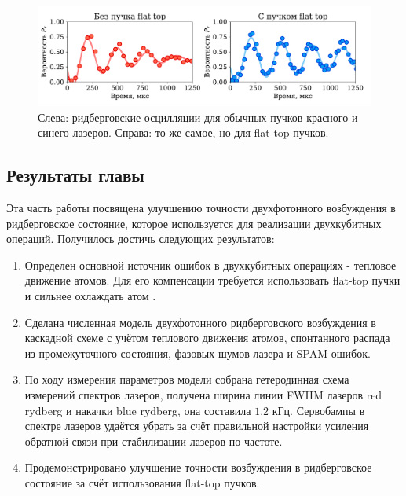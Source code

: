 \begin{figure}[H]
	\centering
	\includegraphics[width=1.0\textwidth]{images/rydberg_flattop_comp.pdf}
	\caption{Слева: ридберговские осцилляции для обычных пучков красного и синего лазеров. Справа: то же самое, но для flat-top пучков.}
	\label{fig:rydberg_flattop_comparison}
\end{figure}

\subsection{Результаты главы}

Эта часть работы посвящена улучшению точности двухфотонного возбуждения в ридберговское состояние, которое используется для реализации двухкубитных операций. Получилось достичь следующих результатов:

\begin{enumerate}
	\item  Определен основной источник ошибок в двухкубитных операциях - тепловое движение атомов. Для его компенсации требуется использовать flat-top пучки \cite{Gillen_Christandl_2016} и сильнее охлаждать атом \cite{PhysRevA.96.033406}.

	\item Сделана численная модель двухфотонного ридберговского возбуждения в каскадной схеме с учётом теплового движения атомов, спонтанного распада из промежуточного состояния, фазовых шумов лазера и SPAM-ошибок. 

	\item По ходу измерения параметров модели собрана гетеродинная схема измерений спектров лазеров, получена ширина линии FWHM лазеров red rydberg и накачки blue rydberg, она составила $1.2\text{ кГц}$. Сервобампы в спектре лазеров удаётся убрать за счёт правильной настройки усиления обратной связи при стабилизации лазеров по частоте. 

	\item Продемонстрировано улучшение точности возбуждения в ридберговское состояние за счёт использования flat-top пучков.
\end{enumerate}

\newpage